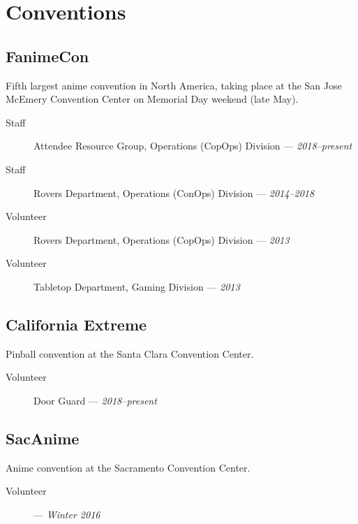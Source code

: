 \documentclass[10pt]{article}
\author{August Valera}
\begin{document}

\section*{Conventions}

\subsection*{FanimeCon}
Fifth largest anime convention in North America, taking place at the San Jose
McEmery Convention Center on Memorial Day weekend (late May).

\begin{description}
  \item[Staff] Attendee Resource Group, Operations (CopOps) Division ---
    \textit{2018--present}
  \item[Staff] Rovers Department, Operations (ConOps) Division ---
    \textit{2014--2018}
  \item[Volunteer] Rovers Department, Operations (CopOps) Division --- \textit{2013}
  \item[Volunteer] Tabletop Department, Gaming Division --- \textit{2013}
\end{description}

\subsection*{California Extreme}
Pinball convention at the Santa Clara Convention Center.

\begin{description}
  \item[Volunteer] Door Guard --- \textit{2018--present}
\end{description}

\subsection*{SacAnime}
Anime convention at the Sacramento Convention Center.

\begin{description}
  \item[Volunteer] --- \textit{Winter 2016}
\end{description}
\end{document}
